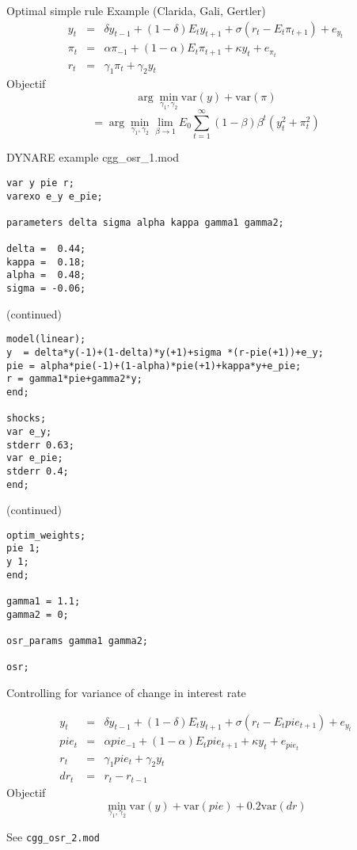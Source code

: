 \documentclass{beamer}
\begin{document}
\begin{slide}{Optimal simple rule}
Example (Clarida, Gali, Gertler)
  \begin{eqnarray*}
    y_t  &=& \delta y_{t-1}  + (1-\delta)E_ty_{t+1}+\sigma (r_t - E_t\pi_{t+1}) + e_{y_t}\\ 
\pi_t  &=&   \alpha \pi_{-1} + (1-\alpha) E_t \pi_{t+1} + \kappa y_t + e_{\pi_t}\\
r_t &=& \gamma_1 \pi_t+\gamma_2 y_t
  \end{eqnarray*}
Objectif
\[
\arg\min_{\gamma_1,\gamma_2}\mbox{var}(y)+\mbox{var}(\pi)   
\]
\[
=\arg\min_{\gamma_1,\gamma_2}\lim_{\beta\rightarrow 1}E_0\sum_{t=1}^\infty (1-\beta)\beta^t(y_t^2+\pi_t^2)
\]
\end{slide}

\begin{slide}{DYNARE example cgg\_osr\_1.mod}
{\small
\begin{verbatim}
var y pie r;
varexo e_y e_pie;

parameters delta sigma alpha kappa gamma1 gamma2;

delta =  0.44;
kappa =  0.18;
alpha =  0.48;
sigma = -0.06;
\end{verbatim}
}
\end{slide}

\begin{slide}{(continued)}
{\small
\begin{verbatim}
model(linear);
y  = delta*y(-1)+(1-delta)*y(+1)+sigma *(r-pie(+1))+e_y; 
pie = alpha*pie(-1)+(1-alpha)*pie(+1)+kappa*y+e_pie;
r = gamma1*pie+gamma2*y;
end;

shocks;
var e_y;
stderr 0.63;
var e_pie;
stderr 0.4;
end;
\end{verbatim}
}
\end{slide}

\begin{slide}{(continued)}
{\small
\begin{verbatim}
optim_weights;
pie 1;
y 1;
end;

gamma1 = 1.1;
gamma2 = 0;

osr_params gamma1 gamma2;

osr;
\end{verbatim}
}  
\end{slide}

\begin{slide}{Controlling for variance of change in interest rate}

  \begin{eqnarray*}
    y_t  &=& \delta y_{t-1}  + (1-\delta)E_ty_{t+1}+\sigma (r_t - E_tpie_{t+1}) + e_{y_t}\\ 
pie_t  &=&   \alpha pie_{-1} + (1-\alpha) E_t pie_{t+1} + \kappa y_t + e_{pie_t}\\
r_t &=& \gamma_1 pie_t + \gamma_2 y_t\\
dr_t &=& r_t - r_{t-1}
  \end{eqnarray*}
Objectif
\[
\min_{\gamma_1,\gamma_2}\mbox{var}(y)+\mbox{var}(pie)+0.2\mbox{var}(dr)   
\]

See \verb+cgg_osr_2.mod+
\end{slide}
\end{document}

